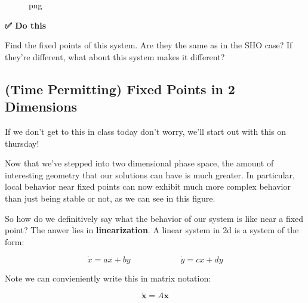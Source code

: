 \begin{figure}
\centering
{}
\caption{png}
\end{figure}

\textbf{✅ Do this}

Find the fixed points of this system. Are they the same as in the SHO
case? If they're different, what about this system makes it different?

\subsection{(Time Permitting) Fixed Points in 2
Dimensions}\label{time-permitting-fixed-points-in-2-dimensions}

If we don't get to this in class today don't worry, we'll start out with
this on thursday!

Now that we've stepped into two dimensional phase space, the amount of
interesting geometry that our solutions can have is much greater. In
particular, local behavior near fixed points can now exhibit much more
complex behavior than just being stable or not, as we can see in this
figure.

So how do we definitively say what the behavior of our system is like
near a fixed point? The anwer lies in \textbf{linearization}. A linear
system in 2d is a system of the form:

\[
\dot{x} = ax + by \hspace{1in} \dot{y} = cx + dy
\]

Note we can convieniently write this in matrix notation:

\[
\dot{\mathbf{x}} = A\mathbf{x}
\]

